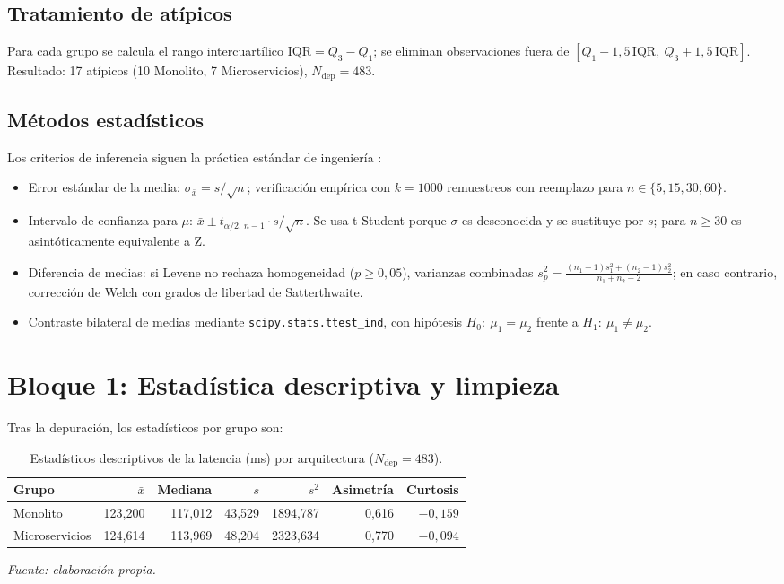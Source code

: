 \documentclass[12pt,a4paper]{article}
\newcommand{\fuentep}{\par\vspace{2pt}\footnotesize\textit{Fuente: elaboración propia.}\par}
\begin{document}
\subsection{Tratamiento de atípicos}
Para cada grupo se calcula el rango intercuartílico $\mathrm{IQR}=Q_3-Q_1$; se eliminan observaciones fuera de $[Q_1-1{,}5\,\mathrm{IQR},\ Q_3+1{,}5\,\mathrm{IQR}]$. Resultado: 17 atípicos (10 Monolito, 7 Microservicios), $N_{\text{dep}}=483$.

\subsection{Métodos estadísticos}
Los criterios de inferencia siguen la práctica estándar de ingeniería \cite{montgomery2021applied, wasserman2004all}:
\begin{itemize}
\item Error estándar de la media: $\sigma_{\bar x} = s/\sqrt{n}$; verificación empírica con $k=1000$ remuestreos con reemplazo para $n\in\{5,15,30,60\}$.
\item Intervalo de confianza para $\mu$: $\bar x \pm t_{\alpha/2,\,n-1}\cdot s/\sqrt{n}$. Se usa t-Student porque $\sigma$ es desconocida y se sustituye por $s$; para $n\geq30$ es asintóticamente equivalente a Z.
\item Diferencia de medias: si Levene no rechaza homogeneidad ($p\geq0{,}05$), varianzas combinadas $s_p^2=\frac{(n_1-1)s_1^2+(n_2-1)s_2^2}{n_1+n_2-2}$; en caso contrario, corrección de Welch con grados de libertad de Satterthwaite.
\item Contraste bilateral de medias mediante \texttt{scipy.stats.ttest\_ind}, con hipótesis $H_0:\ \mu_1=\mu_2$ frente a $H_1:\ \mu_1\neq\mu_2$.
\end{itemize}

\section{Bloque 1: Estadística descriptiva y limpieza}
Tras la depuración, los estadísticos por grupo son:
\begin{table}[htbp]
\centering
\caption{Estadísticos descriptivos de la latencia (ms) por arquitectura ($N_{\text{dep}}=483$).}
\begin{tabular}{lrrrrrr}
\toprule
Grupo & $\bar x$ & Mediana & $s$ & $s^2$ & Asimetría & Curtosis \\
\midrule
Monolito & 123,200 & 117,012 & 43,529 & 1894,787 & 0,616 & $-0,159$ \\
Microservicios & 124,614 & 113,969 & 48,204 & 2323,634 & 0,770 & $-0,094$ \\
\bottomrule
\end{tabular}
\fuentep
\end{table}
\end{document}
